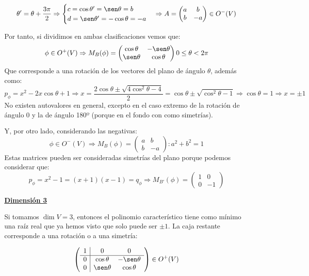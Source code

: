 \documentclass[10pt,a4paper,openright]{book}
\begin{document}
$$\theta' = \theta +\frac{3\pi}{2} \Rightarrow \begin{cases} c = \cos \theta' = \sen \theta = b \\ d = \sen \theta' = -\cos\theta = -a \end{cases} \Rightarrow A = \begin{pmatrix} a & b \\ b & -a\end{pmatrix}\in O^-(V)$$

Por tanto, si dividimos en ambas clasificaciones vemos que:
$$\phi\in O^+(V)\Rightarrow M_B(\phi)  = \begin{pmatrix} \cos \theta & -\sen \theta  \\ \sen \theta & \cos \theta \end{pmatrix} 0 \leq \theta < 2\pi$$
Que corresponde a una rotación de los vectores del plano de ángulo $\theta$, además como:
$$p_\phi = x^2-2x\cos \theta + 1\Rightarrow x = \frac{2\cos\theta \pm \sqrt{4\cos^2\theta - 4}}{2} = \cos\theta \pm \sqrt{\cos^2\theta - 1}\Rightarrow \cos\theta = 1\Rightarrow x = \pm 1$$
No existen autovalores en general, excepto en el caso extremo de la rotación de ángulo 0 y la de ángulo 180º (porque en el fondo con como simetrías).

Y, por otro lado, considerando las negativas:
$$ \phi  \in O^-(V)\Rightarrow M_B(\phi) = \begin{pmatrix} a & b  \\ b & -a  \end{pmatrix}: a^2 + b^2 = 1$$
Estas matrices pueden ser consideradas simetrías del plano porque podemos considerar que:
$$p_\phi = x^2 - 1 = (x+1)(x-1) = q_\phi\Rightarrow M_{B'}(\phi) = \begin{pmatrix} 1 & 0  \\ 0 & -1  \end{pmatrix}$$

\underline{\textbf{Dimensión 3}}

Si tomamos $\dim V = 3$, entonces el polinomio característico tiene como mínimo una raíz real que ya hemos visto que solo puede ser $\pm 1$. La caja restante corresponde a una rotación o a una simetría:

$$\left(\begin{array}{c|cc}
1  & 0 & 0 \\
\hline
0  & \cos\theta & -\sen\theta \\
0 & \sen\theta & \cos\theta
\end{array}
\right) \in O^+ (V)$$
\end{document}
